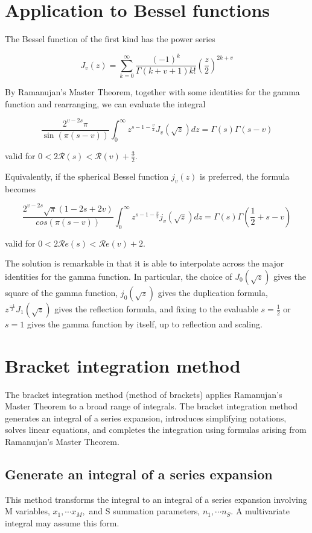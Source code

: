 \documentclass{article}
\begin{document}
\section{Application to Bessel functions}

The Bessel function of the first kind has the power series

$$
J_v(z) = \sum_{k=0}^\infty \frac{(-1)^k}{\Gamma (k+v+1)k!} \left(\frac{z}{2}\right)^{2k+v}
$$

By Ramanujan's Master Theorem, together with some identities for the gamma function and rearranging, we can evaluate the integral

$$
\frac{2^{v-2s} \pi}{\sin(\pi(s-v))} \int_0^\infty z^{s-1-\frac{v}{2}} J_v(\sqrt{z})dz = \Gamma(s)\Gamma(s-v)
$$

valid for $0 < 2 \mathcal{R}(s) < \mathcal{R}(v) + \frac{3}{2}$.

Equivalently, if the spherical Bessel function $j_v(z)$ is preferred, the formula becomes

$$
\frac{2^{v-2s}\sqrt{\pi}(1-2s+2v)}{cos(\pi(s-v))} \int_0^\infty z^{s-1-\frac{v}{2}} j_v(\sqrt{z})dz = \Gamma(s)\Gamma\left(\frac{1}{2} + s - v\right)
$$

valid for $0 < 2 \mathcal{R}e(s) < \mathcal{R}e(v) + 2$.

The solution is remarkable in that it is able to interpolate across the major identities for the gamma function. In particular, the choice of $J_0(\sqrt{z})$ gives the square of the gamma function, $j_0(\sqrt{z})$ gives the duplication formula, $z^{\frac{-1}{2}} J_  1(\sqrt{z})$ gives the reflection formula, and fixing to the evaluable $s = \frac{1}{2}$ or $s=1$ gives the gamma function by itself, up to reflection and scaling.

\section{Bracket integration method}
The bracket integration method (method of brackets) applies Ramanujan's Master Theorem to a broad range of integrals. The bracket integration method generates an integral of a series expansion, introduces simplifying notations, solves linear equations, and completes the integration using formulas arising from Ramanujan's Master Theorem.\cite{open_maths}

\subsection{Generate an integral of a series expansion}
This method transforms the integral to an integral of a series expansion involving M variables, $x_1,\cdots x_M,$ and S summation parameters, $n_1,\cdots n_S$. A multivariate integral may assume this form.\cite{citation2}
\end{document}
